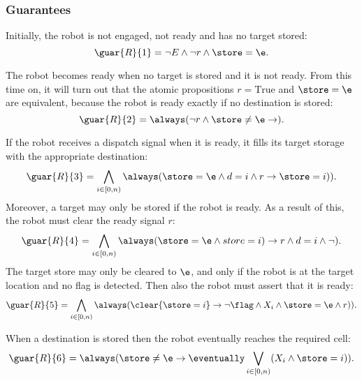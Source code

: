 \subsubsection{Guarantees}

Initially, the robot is not engaged, not ready and has no target stored:
\begin{equation*}
    \guar{R}{1} = \neg E \wedge \neg r \wedge \store=\e.
\end{equation*}

The robot becomes ready when no target is stored and it is not ready. From this time on, it will turn out that the atomic propositions $r = \mathrm{True}$ and $\store=\e$ are equivalent, because the robot is ready exactly if no destination is stored:
\begin{equation*}
    \guar{R}{2} = \always(\neg r \wedge \store\neq\e \rightarrow \next r).
\end{equation*}

If the robot receives a dispatch signal when it is ready, it fills its target storage with the appropriate destination:
\begin{equation*}
    \guar{R}{3} = \bigwedge_{i \in [0, n)} \always(\store=\e \wedge d=i \wedge r \rightarrow \next(\store=i)).
\end{equation*}
Moreover, a target may only be stored if the robot is ready. As a result of this, the robot must clear the ready signal $r$:
\begin{equation*}
    \guar{R}{4} = \bigwedge_{i \in [0, n)} \always(\store=\e \wedge \next(store=i) \rightarrow r \wedge d=i \wedge \neg\next r).
\end{equation*}
The target store may only be cleared to $\e$, and only if the robot is at the target location and no flag is detected. Then also the robot must assert that it is ready:
\begin{equation*}
    \guar{R}{5} = \bigwedge_{i \in [0, n)} \always(\clear{\store=i} \rightarrow \neg\flag \wedge X_i \wedge \next(\store=\e \wedge r)).
\end{equation*}

When a destination is stored then the robot eventually reaches the required cell:
\begin{equation*}
    \guar{R}{6} = \always(\store\neq\e \rightarrow \eventually \bigvee_{i \in [0, n)} (X_i \wedge \store=i)).
\end{equation*}

